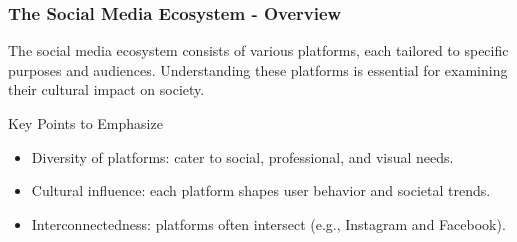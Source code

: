 \documentclass{beamer}
\begin{document}
\begin{frame}[fragile]
    \frametitle{The Social Media Ecosystem - Overview}
    The social media ecosystem consists of various platforms, each tailored to specific purposes and audiences. 
    Understanding these platforms is essential for examining their cultural impact on society.
    
    \begin{block}{Key Points to Emphasize}
        \begin{itemize}
            \item Diversity of platforms: cater to social, professional, and visual needs.
            \item Cultural influence: each platform shapes user behavior and societal trends.
            \item Interconnectedness: platforms often intersect (e.g., Instagram and Facebook).
        \end{itemize}
    \end{block}
\end{frame}
\end{document}
